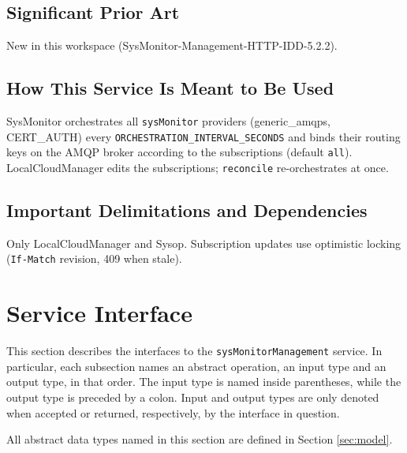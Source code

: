 \documentclass[a4paper]{arrowhead}
\begin{document}
\subsection{Significant Prior Art}

New in this workspace (SysMonitor-Management-HTTP-IDD-5.2.2).

\subsection{How This Service Is Meant to Be Used}

SysMonitor orchestrates all \texttt{sysMonitor} providers (generic\_amqps, CERT\_AUTH) every \texttt{ORCHESTRATION\_\allowbreak{}INTERVAL\_\allowbreak{}SECONDS} and binds their routing keys on the AMQP broker according to the subscriptions (default \texttt{all}). LocalCloudManager edits the subscriptions; \texttt{reconcile} re-orchestrates at once.

\subsection{Important Delimitations and Dependencies}
\label{sec:delimitations}

Only LocalCloudManager and Sysop. Subscription updates use optimistic locking (\texttt{If-\allowbreak{}Match} revision, 409 when stale).

\newpage

\section{Service Interface}
\label{sec:operations}

This section describes the interfaces to the \texttt{sys\allowbreak{}Monitor\allowbreak{}Management} service.
In particular, each subsection names an abstract operation, an input type and an output type, in that order.
The input type is named inside parentheses, while the output type is preceded by a colon.
Input and output types are only denoted when accepted or returned, respectively, by the interface in question.

All abstract data types named in this section are defined in Section \ref{sec:model}.
\end{document}
